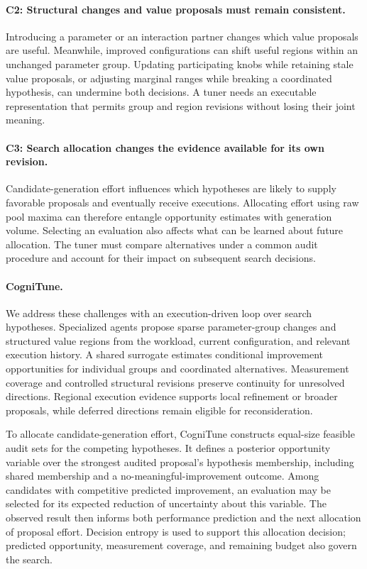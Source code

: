 \paragraph{C2: Structural changes and value proposals must remain consistent.}
Introducing a parameter or an interaction partner changes which value proposals are useful. Meanwhile, improved configurations can shift useful regions within an unchanged parameter group. Updating participating knobs while retaining stale value proposals, or adjusting marginal ranges while breaking a coordinated hypothesis, can undermine both decisions. A tuner needs an executable representation that permits group and region revisions without losing their joint meaning.

\paragraph{C3: Search allocation changes the evidence available for its own revision.}
Candidate-generation effort influences which hypotheses are likely to supply favorable proposals and eventually receive executions. Allocating effort using raw pool maxima can therefore entangle opportunity estimates with generation volume. Selecting an evaluation also affects what can be learned about future allocation. The tuner must compare alternatives under a common audit procedure and account for their impact on subsequent search decisions.

\paragraph{CogniTune.}
We address these challenges with an execution-driven loop over search hypotheses. Specialized agents propose sparse parameter-group changes and structured value regions from the workload, current configuration, and relevant execution history. A shared surrogate estimates conditional improvement opportunities for individual groups and coordinated alternatives. Measurement coverage and controlled structural revisions preserve continuity for unresolved directions. Regional execution evidence supports local refinement or broader proposals, while deferred directions remain eligible for reconsideration.

To allocate candidate-generation effort, CogniTune constructs equal-size feasible audit sets for the competing hypotheses. It defines a posterior opportunity variable over the strongest audited proposal's hypothesis membership, including shared membership and a no-meaningful-improvement outcome. Among candidates with competitive predicted improvement, an evaluation may be selected for its expected reduction of uncertainty about this variable. The observed result then informs both performance prediction and the next allocation of proposal effort. Decision entropy is used to support this allocation decision; predicted opportunity, measurement coverage, and remaining budget also govern the search.

